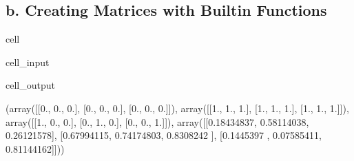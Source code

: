 \documentclass[letterpaper,10pt,english]{jupyterBook}
\begin{document}
\subsection{b. Creating Matrices with Built\sphinxhyphen{}in Functions}
\label{\detokenize{lessons/Intro_to_Matrices_in_NumPy:b-creating-matrices-with-built-in-functions}}
\begin{sphinxuseclass}{cell}\begin{sphinxVerbatimInput}

\begin{sphinxuseclass}{cell_input}
\begin{sphinxVerbatim}[commandchars=\\\{\}]
   

   

  

   

   
\end{sphinxVerbatim}

\end{sphinxuseclass}\end{sphinxVerbatimInput}
\begin{sphinxVerbatimOutput}

\begin{sphinxuseclass}{cell_output}
\begin{sphinxVerbatim}[commandchars=\\\{\}]
(array([[0., 0., 0.],
        [0., 0., 0.],
        [0., 0., 0.]]),
 array([[1., 1., 1.],
        [1., 1., 1.],
        [1., 1., 1.]]),
 array([[1., 0., 0.],
        [0., 1., 0.],
        [0., 0., 1.]]),
 array([[0.18434837, 0.58114038, 0.26121578],
        [0.67994115, 0.74174803, 0.8308242 ],
        [0.1445397 , 0.07585411, 0.81144162]]))
\end{sphinxVerbatim}

\end{sphinxuseclass}\end{sphinxVerbatimOutput}

\end{sphinxuseclass}
\end{document}
